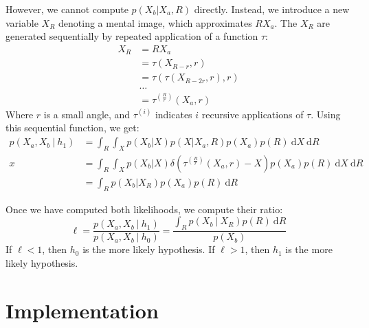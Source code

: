\documentclass{article} %
\begin{document}
However, we cannot compute $p(X_b\vert X_a, R)$ directly. Instead, we
introduce a new variable $X_R$ denoting a mental image, which
approximates $RX_a$. The $X_R$ are generated sequentially by repeated
application of a function $\tau$:
\begin{align}
  X_R&=RX_a\nonumber \\
  &=\tau(X_{R-r}, r)\nonumber \\
  &=\tau(\tau(X_{R-2r}, r), r)\nonumber \\
  &\ldots{}\nonumber \\
  &=\tau^{(\frac{R}{r})}(X_a, r)
  \label{eq:tau}
\end{align} 
Where $r$ is a small angle, and $\tau^{(i)}$ indicates $i$ recursive
applications of $\tau$. Using this sequential function, we get:
\begin{align}
  p(X_a, X_b\ \vert \ h_1)&=\int_R \int_{X} p(X_b\vert X) p(X\vert X_a, R)p(X_a)p(R)\ \mathrm{d}X\ \mathrm{d}R \nonumber \\
  x&= \int_R \int_X p(X_b\vert X)\delta(\tau^{(\frac{R}{r})}(X_a, r)-X)p(X_a)p(R)\ \mathrm{d}X\ \mathrm{d}R \nonumber \\
  &= \int_R p(X_b\vert X_R)p(X_a)p(R)\ \mathrm{d}R
  \label{eq:lh-h1}
\end{align}

Once we have computed both likelihoods, we compute their ratio:
\begin{equation}
  \ell=\frac{p(X_a, X_b\ \vert \ h_1)}{p(X_a, X_b\ \vert \ h_0)}=\frac{\int_R p(X_b\ \vert\ X_R)p(R)\ \mathrm{d}R}{p(X_b)}
  \label{eq:lh-ratio}
\end{equation}
If $\ell<1$, then $h_0$ is the more likely hypothesis. If $\ell>1$,
then $h_1$ is the more likely hypothesis.

\section{Implementation}
\end{document}
